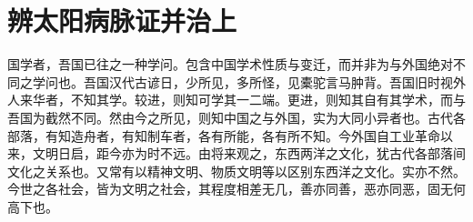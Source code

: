 \chapter{辨太阳病脉证并治\hspace{0.5em}上}

国学者，吾国已往之一种学问。包含中国学术性质与变迁，而并非为与外国绝对不同之学问也。吾国汉代古谚日，少所见，多所怪，见橐驼言马肿背。吾国旧时视外人来华者，不知其学。较进，则知可学其一二端。更进，则知其自有其学术，而与吾国为截然不同。然由今之所见，则知中国之与外国，实为大同小异者也。古代各部落，有知造舟者，有知制车者，各有所能，各有所不知。今外国自工业革命以来，文明日启，距今亦为时不远。由将来观之，东西两洋之文化，犹古代各部落间文化之关系也。又常有以精神文明、物质文明等以区别东西洋之文化。实亦不然。今世之各社会，皆为文明之社会，其程度相差无几，善亦同善，恶亦同恶，固无何高下也。